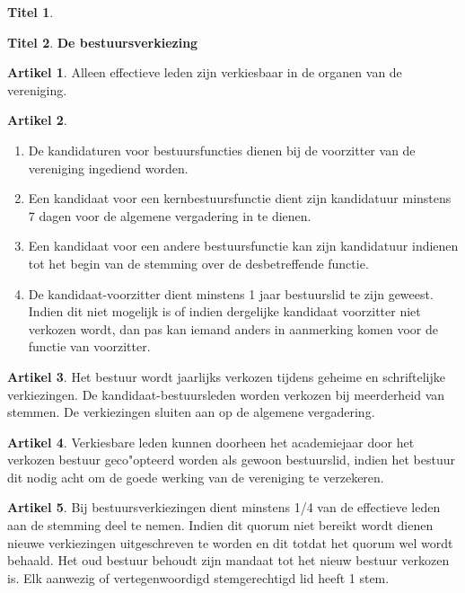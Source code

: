 \documentclass[a4paper,10pt]{article}
\theoremstyle{definition}
\newtheorem{titel}{\newline\Large Titel}
\newtheorem{artikel}{\large Artikel}
\newcommand{\ttext}[1]{\Large \textbf{#1} \normalsize}
\newcommand{\ttextcr}{\hfill\newline}
\newcommand{\ttextenum}{\mbox{}}
\begin{document}
\begin{titel}
\end{titel}


\begin{titel}\ttext{De bestuursverkiezing}

  \begin{artikel}\ttextcr
    Alleen effectieve leden zijn verkiesbaar in de organen van de vereniging.
  \end{artikel}

  \begin{artikel}\ttextenum
    \begin{enumerate}
      \item
        De kandidaturen voor bestuursfuncties dienen bij de voorzitter van de vereniging ingediend worden.
      \item
        Een kandidaat voor een kernbestuursfunctie dient zijn kandidatuur minstens 7 dagen voor de algemene vergadering in te dienen.
      \item
        Een kandidaat voor een andere bestuursfunctie kan zijn kandidatuur indienen tot het begin van de stemming over de desbetreffende functie.
      \item
        De kandidaat-voorzitter dient minstens 1 jaar bestuurslid te zijn geweest.
        Indien dit niet mogelijk is of indien dergelijke kandidaat voorzitter niet verkozen wordt, dan pas kan iemand anders in aanmerking komen voor de functie van voorzitter.
    \end{enumerate}
  \end{artikel}

  \begin{artikel}\ttextcr
    Het bestuur wordt jaarlijks verkozen tijdens geheime en schriftelijke verkiezingen.
    De kandidaat-bestuursleden worden verkozen bij meerderheid van stemmen.
    De verkiezingen sluiten aan op de algemene vergadering.
  \end{artikel}

  \begin{artikel}\ttextcr
    Verkiesbare leden kunnen doorheen het academiejaar door het verkozen bestuur geco"opteerd worden als gewoon bestuurslid, indien het bestuur dit nodig acht om de goede werking van de vereniging te verzekeren.
  \end{artikel}

  \begin{artikel}\ttextcr
    Bij bestuursverkiezingen dient minstens 1/4 van de effectieve leden aan de stemming deel te nemen.
    Indien dit quorum niet bereikt wordt dienen nieuwe verkiezingen uitgeschreven te worden en dit totdat het quorum wel wordt behaald.
    Het oud bestuur behoudt zijn mandaat tot het nieuw bestuur verkozen is.
    Elk aanwezig of vertegenwoordigd stemgerechtigd lid heeft 1 stem.
  \end{artikel}

\end{titel}
\end{document}
